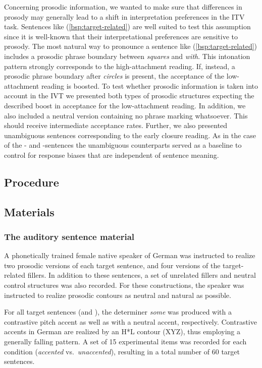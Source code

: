\documentclass[fleqn,reqno,10pt,draft]{article}
\newcommand{\as}{\acro{as}}
\renewcommand{\es}{\acro{es}}
\begin{document}
Concerning prosodic information, we wanted to make sure that
differences in prosody may generally lead to a shift in interpretation
preferences in the ITV task. Sentences like (\ref{bsp:target-related})
are well suited to test this assumption since it is well-known that
their interpretational preferences are sensitive to prosody. The most
natural way to pronounce a sentence like (\ref{bsp:target-related})
includes a prosodic phrase boundary between {\it squares} and {\it
  with}. This intonation pattern strongly corresponds to the
high-attachment reading. If, instead, a prosodic phrase boundary after
{\it circles} is present, the acceptance of the low-attachment reading
is boosted. To test whether prosodic information is taken into account
in the IVT we presented both types of prosodic structures expecting
the described boost in acceptance for the low-attachment reading. In
addition, we also included a neutral version containing no phrase
marking whatsoever. This should receive intermediate acceptance
rates. Further, we also presented unambiguous sentences corresponding
to the early closure reading. As in the case of the \as- and
\es-sentences the unambiguous counterparts served as a baseline to
control for response biases that are independent of sentence meaning.

\subsection{Procedure}
\label{sec:procedure}   

\subsection{Materials}
\label{sec:materials}

\subsubsection{The auditory sentence material}
\label{sec:audit-sent-mater}

A phonetically trained female native speaker of German was instructed
to realize two prosodic versions of each target sentence, and four
versions of the target-related fillers. In addition to these
sentences, a set of unrelated fillers and neutral control structures
was also recorded. For these constructions, the speaker was instructed
to realize prosodic contours as neutral and natural as possible.

For all target sentences (\as and \es), the determiner \emph{some} was
produced with a contrastive pitch accent as well as with a neutral
accent, respectively. Contrastive accents in German are realized by an
H*L contour (XYZ), thus employing a generally
falling pattern. A set of 15 experimental items was recorded for each
condition (\emph{accented} vs.~\emph{unaccented}), resulting in a
total number of 60 target sentences.
\end{document}
